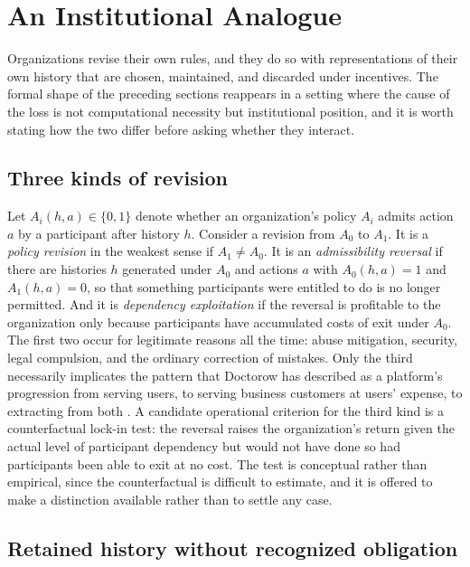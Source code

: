 \documentclass[11pt]{article}
\theoremstyle{definition}
\theoremstyle{remark}
\newcommand{\Bool}{\{0,1\}}
\begin{document}
\section{An Institutional Analogue}\label{sec:institutional}

Organizations revise their own rules, and they do so with representations of their own history that are chosen, maintained, and discarded under incentives. The formal shape of the preceding sections reappears in a setting where the cause of the loss is not computational necessity but institutional position, and it is worth stating how the two differ before asking whether they interact.

\subsection{Three kinds of revision}

Let $A_i(h,a)\in\Bool$ denote whether an organization's policy $A_i$ admits action $a$ by a participant after history $h$. Consider a revision from $A_0$ to $A_1$. It is a \emph{policy revision} in the weakest sense if $A_1\ne A_0$. It is an \emph{admissibility reversal} if there are histories $h$ generated under $A_0$ and actions $a$ with $A_0(h,a)=1$ and $A_1(h,a)=0$, so that something participants were entitled to do is no longer permitted. And it is \emph{dependency exploitation} if the reversal is profitable to the organization only because participants have accumulated costs of exit under $A_0$. The first two occur for legitimate reasons all the time: abuse mitigation, security, legal compulsion, and the ordinary correction of mistakes. Only the third necessarily implicates the pattern that Doctorow has described as a platform's progression from serving users, to serving business customers at users' expense, to extracting from both \cite{doctorow}. A candidate operational criterion for the third kind is a counterfactual lock-in test: the reversal raises the organization's return given the actual level of participant dependency but would not have done so had participants been able to exit at no cost. The test is conceptual rather than empirical, since the counterfactual is difficult to estimate, and it is offered to make a distinction available rather than to settle any case.

\subsection{Retained history without recognized obligation}
\end{document}
